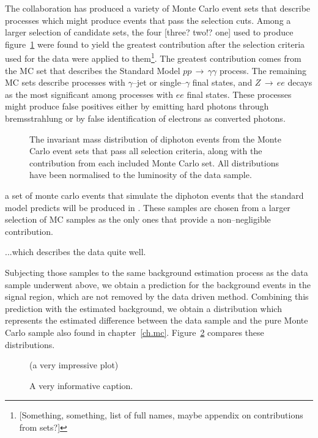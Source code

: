 The \atlas{} collaboration has produced a variety of Monte Carlo event sets that describe processes which might produce events that pass the selection cuts. Among a larger selection of candidate sets, the four [three? two!? one\textinterrobang\textinterrobang] used to produce figure~\ref{mclist} were found to yield the greatest contribution after the selection criteria used for the data were applied to them\footnote{[Something, something, list of full names, maybe appendix on contributions from sets?]}. The greatest contribution comes from the MC set that describes the Standard Model $pp\,\rightarrow\,\gamma\gamma$ process. The remaining MC sets describe processes with $\gamma$--jet or single--$\gamma$ final states, and  $Z\,\rightarrow\,ee$ decays as the most significant among processes with $ee$ final states. These processes might produce false positives either by emitting hard photons through bremsstrahlung or by false identification of electrons as converted photons.

\begin{figure}[htp]
\begin{minipage}[b]{.69\textwidth}
\begin{infilsf} \tiny

\end{infilsf}
\end{minipage}
\begin{minipage}[b]{.3\textwidth}
\caption{The invariant mass distribution of diphoton events from the \atlas{} Monte Carlo event sets that pass all selection criteria, along with the contribution from each included Monte Carlo set. All distributions have been normalised to the luminosity of the data sample.}
\label{mclist}
\end{minipage}
\end{figure}


a set of monte carlo events that simulate the diphoton events that the standard model predicts will be produced in \atlas{}. These samples are chosen from a larger selection of MC samples as the only ones that provide a non--negligible contribution.

...which describes the data quite well.

Subjecting those samples to the same background estimation process as the data sample underwent above, we obtain a prediction for the background events in the signal region, which are not removed by the data driven method. Combining this prediction with the estimated background, we obtain a distribution which represents the estimated difference between the data sample and the pure Monte Carlo sample also found in chapter~\ref{ch.mc}. Figure~\ref{tobck} compares these distributions.

\begin{figure}[htp]
\begin{minipage}[b]{.69\textwidth}
\centering (a very impressive plot)
\end{minipage}\hfill\begin{minipage}[b]{.3\textwidth}
\caption{A very informative caption.
\label{tobck}}
\end{minipage}
\end{figure}




